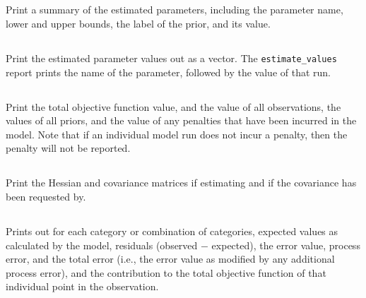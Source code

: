 \subsection{}

Print a summary of the estimated parameters, including the parameter name, lower and upper bounds, the label of the prior, and its value.

\subsection{}

Print the estimated parameter values out as a vector. The \texttt{estimate\_values} report prints the name of the parameter, followed by the value of that run.

\subsection{}

Print the total objective function value, and the value of all observations, the values of all priors, and the value of any penalties that have been incurred in the model. Note that if an individual model run does not incur a penalty, then the penalty will not be reported.

\subsection{}

Print the Hessian and covariance matrices if estimating and if the covariance has been requested by.

\subsection{}

Prints out for each category or combination of categories, expected values as calculated by the model, residuals (observed $-$ expected), the error value, process error, and the total error (i.e., the error value as modified by any additional process error), and the contribution to the total objective function of that individual point in the observation. 

